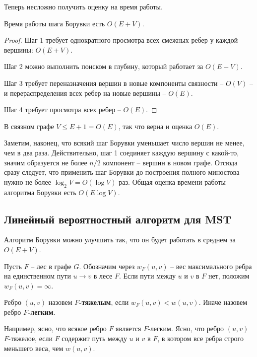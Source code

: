 Теперь несложно получить оценку на время работы.

\begin{lemma*} Время работы шага Борувки есть $O(E+V)$. \end{lemma*}
\begin{proof}

Шаг 1 требует однократного просмотра всех смежных ребер у каждой вершины: $O(E+V)$.

Шаг 2 можно выполнить поиском в глубину, который работает за $O(E+V)$.

Шаг 3 требует переназначения вершин в новые компоненты связности -- $O(V)$ -- и перераспределения всех ребер на новые вершины  -- $O(E)$.

Шаг 4 требует просмотра всех ребер -- $O(E)$.
\end{proof}

В связном графе $V \leq E + 1 = O(E)$, так что верна и оценка $O(E)$.

Заметим, наконец, что всякий шаг Борувки уменьшает число вершин не менее, чем в два раза. Действительно, шаг 1 соединяет каждую вершину с какой-то, значим образуется не более $n/2$ компонент -- вершин в новом графе. Отсюда сразу следует, что применить шаг Борувки до построения полного миностова нужно не более $\log_2 V = O(\log V)$ раз. Общая оценка времени работы алгоритма Борувки есть $O(E\log V)$.

\subsection{Линейный вероятностный алгоритм для MST}

Алгоритм Борувки можно улучшить так, что он будет работать в среднем за $O(E+V)$. 

Пусть $F$ -- лес в графе $G$. Обозначим через $w_F(u, v)$ -- вес максимального ребра на единственном пути $u \rightarrow v$ в лесе $F$. Если пути между $u$ и $v$ в $F$ нет, положим $w_F(u,v) = \infty$. 
 
\begin{definition*} Ребро $(u,v)$ назовем \textbf{$F$-тяжелым}, если $w_F(u,v) < w(u,v)$. Иначе назовем ребро \textbf{$F$-легким}.
\end{definition*}

Например, ясно, что всякое ребро $F$ является $F$-легким. Ясно, что ребро $(u,v)$ $F$-тяжелое, если $F$ содержит путь между $u$ и $v$ в $F$, в котором все ребра строго меньшего веса, чем $w(u,v)$.

